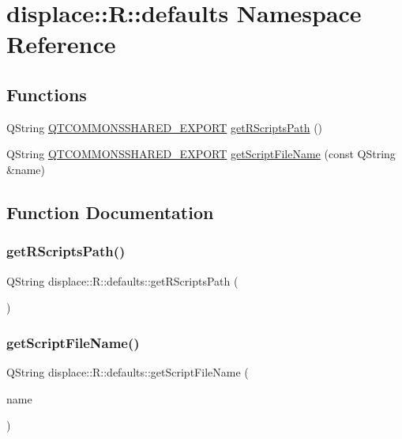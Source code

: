 \hypertarget{namespacedisplace_1_1_r_1_1defaults}{}\section{displace\+::R\+::defaults Namespace Reference}
\label{namespacedisplace_1_1_r_1_1defaults}
\subsection*{Functions}
\begin{DoxyCompactItemize}
\item 
Q\+String \mbox{\hyperlink{qtcommons__global_8h_ab60e1df91d8d01b98c7815ae9a327f01}{Q\+T\+C\+O\+M\+M\+O\+N\+S\+S\+H\+A\+R\+E\+D\+\_\+\+E\+X\+P\+O\+RT}} \mbox{\hyperlink{namespacedisplace_1_1_r_1_1defaults_a82b5c35c36a4a2553b8d3c5fa2f00cae}{get\+R\+Scripts\+Path}} ()
\item 
Q\+String \mbox{\hyperlink{qtcommons__global_8h_ab60e1df91d8d01b98c7815ae9a327f01}{Q\+T\+C\+O\+M\+M\+O\+N\+S\+S\+H\+A\+R\+E\+D\+\_\+\+E\+X\+P\+O\+RT}} \mbox{\hyperlink{namespacedisplace_1_1_r_1_1defaults_a3d24913a84316f208da8ac3ec33f38e8}{get\+Script\+File\+Name}} (const Q\+String \&name)
\end{DoxyCompactItemize}


\subsection{Function Documentation}
\mbox{\label{namespacedisplace_1_1_r_1_1defaults_a82b5c35c36a4a2553b8d3c5fa2f00cae}} 
\subsubsection{\texorpdfstring{getRScriptsPath()}{getRScriptsPath()}}
{\footnotesize\ttfamily Q\+String displace\+::\+R\+::defaults\+::get\+R\+Scripts\+Path (\begin{DoxyParamCaption}{ }\end{DoxyParamCaption})}

\mbox{\label{namespacedisplace_1_1_r_1_1defaults_a3d24913a84316f208da8ac3ec33f38e8}} 
\subsubsection{\texorpdfstring{getScriptFileName()}{getScriptFileName()}}
{\footnotesize\ttfamily Q\+String displace\+::\+R\+::defaults\+::get\+Script\+File\+Name (\begin{DoxyParamCaption}\item[{const Q\+String \&}]{name }\end{DoxyParamCaption})}

